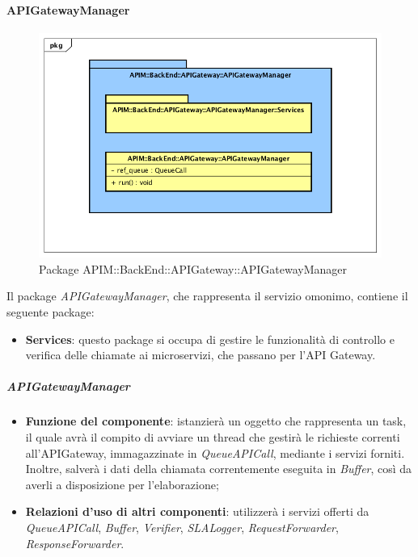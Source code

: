 \paragraph{APIGatewayManager}
\begin{figure}[H]
	\centering
	\includegraphics[scale=0.45]{UML/DiagrammiPackage/APIGatewayManager.png}
	\caption{Package APIM::BackEnd::APIGateway::APIGatewayManager}
\end{figure}

Il package \textit{APIGatewayManager}, che rappresenta il servizio omonimo, contiene il seguente package:
\begin{itemize}
	\item \textbf{Services}: questo package si occupa di gestire le funzionalità di controllo e verifica delle chiamate ai microservizi, che passano per l'API Gateway.
\end{itemize}

\subparagraph{APIGatewayManager}
\begin{itemize}
	\item \textbf{Funzione del componente}: istanzierà un oggetto che rappresenta un task, il quale avrà il compito di avviare un thread che gestirà le richieste correnti all'APIGateway, immagazzinate in \textit{QueueAPICall}, mediante i servizi forniti. Inoltre, salverà i dati della chiamata correntemente eseguita in \textit{Buffer}, così da averli a disposizione per l'elaborazione;
	\item \textbf{Relazioni d'uso di altri componenti}: utilizzerà i servizi offerti da \textit{QueueAPICall}, \textit{Buffer}, \textit{Verifier}, \textit{SLALogger}, \textit{RequestForwarder}, \textit{ResponseForwarder}.
\end{itemize}


